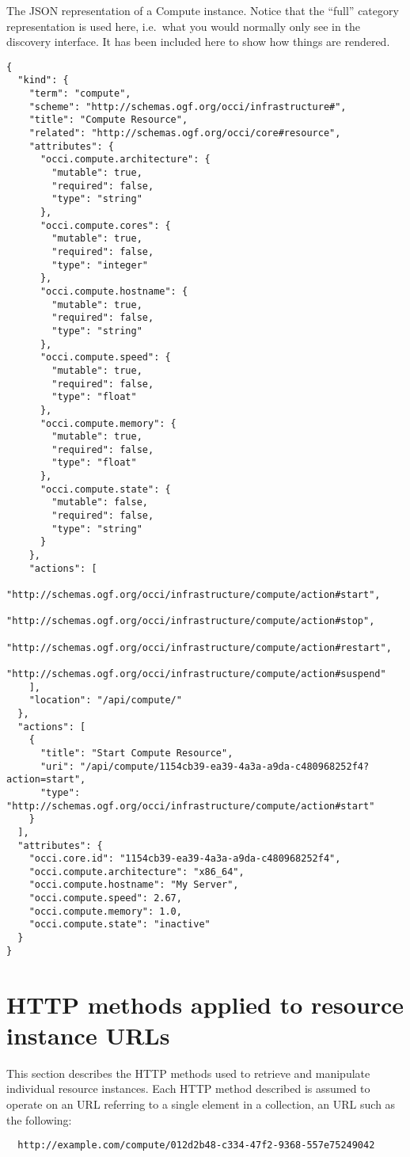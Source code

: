 \documentclass[10pt,a4paper]{article}
\begin{document}
The JSON representation of a Compute instance. Notice that the ``full''
category representation is used here, i.e.~what you would normally only see in
the discovery interface. It has been included here to show how things are
rendered.
\begin{verbatim}
{
  "kind": {
    "term": "compute",
    "scheme": "http://schemas.ogf.org/occi/infrastructure#",
    "title": "Compute Resource",
    "related": "http://schemas.ogf.org/occi/core#resource",
    "attributes": {
      "occi.compute.architecture": {
        "mutable": true,
        "required": false,
        "type": "string"
      },
      "occi.compute.cores": {
        "mutable": true,
        "required": false,
        "type": "integer"
      },
      "occi.compute.hostname": {
        "mutable": true,
        "required": false,
        "type": "string"
      },
      "occi.compute.speed": {
        "mutable": true,
        "required": false,
        "type": "float"
      },
      "occi.compute.memory": {
        "mutable": true,
        "required": false,
        "type": "float"
      },
      "occi.compute.state": {
        "mutable": false,
        "required": false,
        "type": "string"
      }
    },
    "actions": [
      "http://schemas.ogf.org/occi/infrastructure/compute/action#start",
      "http://schemas.ogf.org/occi/infrastructure/compute/action#stop",
      "http://schemas.ogf.org/occi/infrastructure/compute/action#restart",
      "http://schemas.ogf.org/occi/infrastructure/compute/action#suspend"
    ],
    "location": "/api/compute/"
  },
  "actions": [
    {
      "title": "Start Compute Resource",
      "uri": "/api/compute/1154cb39-ea39-4a3a-a9da-c480968252f4?action=start",
      "type": "http://schemas.ogf.org/occi/infrastructure/compute/action#start"
    }
  ],
  "attributes": {
    "occi.core.id": "1154cb39-ea39-4a3a-a9da-c480968252f4",
    "occi.compute.architecture": "x86_64",
    "occi.compute.hostname": "My Server",
    "occi.compute.speed": 2.67,
    "occi.compute.memory": 1.0,
    "occi.compute.state": "inactive"
  }
}
\end{verbatim}

\section{HTTP methods applied to resource instance URLs}

This section describes the HTTP methods used to retrieve and manipulate
individual resource instances. Each HTTP method described is assumed to operate
on an URL referring to a single element in a collection, an URL such as the
following:
\begin{verbatim}
  http://example.com/compute/012d2b48-c334-47f2-9368-557e75249042
\end{verbatim}
\end{document}

